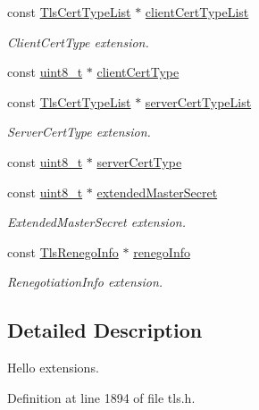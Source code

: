 \begin{DoxyCompactItemize}
const \hyperlink{tls_8h_aef3d0205a40e8c95b8d7019053d3e7ca}{Tls\+Cert\+Type\+List} $\ast$ \hyperlink{structTlsHelloExtensions_a3091449503c4dcce58f3e62d70c24cd0}{client\+Cert\+Type\+List}
\begin{DoxyCompactList}\small\item\em Client\+Cert\+Type extension. \end{DoxyCompactList}\item 
const \hyperlink{stdint_8h_aba7bc1797add20fe3efdf37ced1182c5}{uint8\+\_\+t} $\ast$ \hyperlink{structTlsHelloExtensions_a763ae23601c4eb7b1ec11230ef1f88ed}{client\+Cert\+Type}
\item 
const \hyperlink{tls_8h_aef3d0205a40e8c95b8d7019053d3e7ca}{Tls\+Cert\+Type\+List} $\ast$ \hyperlink{structTlsHelloExtensions_a7e4a609ad6013ea6bcab97286320cf16}{server\+Cert\+Type\+List}
\begin{DoxyCompactList}\small\item\em Server\+Cert\+Type extension. \end{DoxyCompactList}\item 
const \hyperlink{stdint_8h_aba7bc1797add20fe3efdf37ced1182c5}{uint8\+\_\+t} $\ast$ \hyperlink{structTlsHelloExtensions_a2a473c126ac51cf3dd2e999ee6881186}{server\+Cert\+Type}
\item 
const \hyperlink{stdint_8h_aba7bc1797add20fe3efdf37ced1182c5}{uint8\+\_\+t} $\ast$ \hyperlink{structTlsHelloExtensions_a04cc0ffcf992700820ec12d6f43212bf}{extended\+Master\+Secret}
\begin{DoxyCompactList}\small\item\em Extended\+Master\+Secret extension. \end{DoxyCompactList}\item 
const \hyperlink{tls_8h_a91a1f867efbc9e94610e512a667e3e16}{Tls\+Renego\+Info} $\ast$ \hyperlink{structTlsHelloExtensions_aecf5a78a44bd06ba8018bd5f4a5043de}{renego\+Info}
\begin{DoxyCompactList}\small\item\em Renegotiation\+Info extension. \end{DoxyCompactList}\end{DoxyCompactItemize}


\subsection{Detailed Description}
Hello extensions. 

Definition at line 1894 of file tls.\+h.



